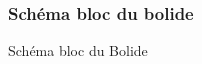 \documentclass[10pt,a4paper,final]{article}
\begin{document}
\begin{spacing}{1.5}
\begin{figure}[hbtp]
\subsubsection{Schéma bloc du bolide}
\caption{Schéma bloc du Bolide}
\centering
{}
\end{figure}

\vfill
\pagebreak


\begin{figure}[hbtp]

\end{figure}
\end{spacing}
\end{document}
